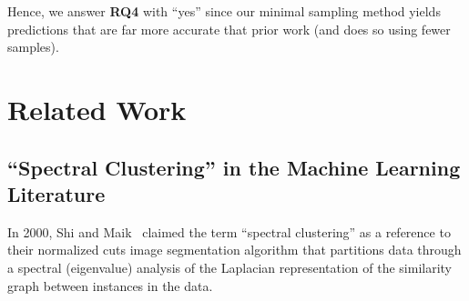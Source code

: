 \documentclass{sig-alternative}
\newcommand{\bi}{\begin{itemize}}%
\newcommand{\ei}{\end{itemize}}
\newcommand{\fig}[1]{Figure~\ref{fig:#1}}
\newcommand{\what}{{\bf WHAT }}
\begin{document}





\begin{myshadowbox}
Hence, we answer {\bf RQ4} with ``yes''
since our minimal sampling method yields predictions that are far more accurate that prior
work (and does so using fewer samples).
\end{myshadowbox}


 \section{Related Work}
 \subsection{``Spectral Clustering'' in the  Machine Learning Literature}\label{sect:related}
 
In 2000, Shi and Maik~\cite{shi00} claimed the term ``spectral clustering'' as a reference to their normalized cuts
image
segmentation algorithm that  partitions data through a spectral (eigenvalue) analysis of the  
Laplacian representation of the similarity graph between instances in the data.
\end{document}

